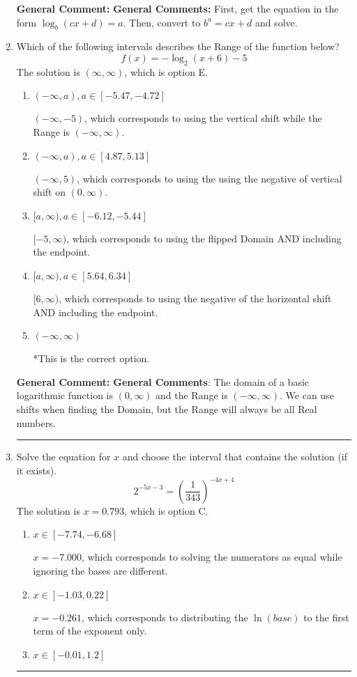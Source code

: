 \documentclass{extbook}[14pt]
\newcommand{\litem}[1]{\item #1

\rule{\textwidth}{0.4pt}}
\begin{document}
\begin{enumerate}
{\textbf{General Comment:} \textbf{General Comments:} First, get the equation in the form $\log_b{(cx+d)} = a$. Then, convert to $b^a = cx+d$ and solve.
}
\litem{
Which of the following intervals describes the Range of the function below?
\[ f(x) = -\log_2{(x+6)}-5 \]The solution is \( (\infty, \infty) \), which is option E.\begin{enumerate}[label=\Alph*.]
\item \( (-\infty, a), a \in [-5.47, -4.72] \)

$(-\infty, -5)$, which corresponds to using the vertical shift while the Range is $(-\infty, \infty)$.
\item \( (-\infty, a), a \in [4.87, 5.13] \)

$(-\infty, 5)$, which corresponds to using the using the negative of vertical shift on $(0, \infty)$.
\item \( [a, \infty), a \in [-6.12, -5.44] \)

$[-5, \infty)$, which corresponds to using the flipped Domain AND including the endpoint.
\item \( [a, \infty), a \in [5.64, 6.34] \)

$[6, \infty)$, which corresponds to using the negative of the horizontal shift AND including the endpoint.
\item \( (-\infty, \infty) \)

*This is the correct option.
\end{enumerate}

\textbf{General Comment:} \textbf{General Comments}: The domain of a basic logarithmic function is $(0, \infty)$ and the Range is $(-\infty, \infty)$. We can use shifts when finding the Domain, but the Range will always be all Real numbers.
}
\litem{
Solve the equation for $x$ and choose the interval that contains the solution (if it exists).
\[ 2^{-5x-3} = \left(\frac{1}{343}\right)^{-4x+4} \]The solution is \( x = 0.793 \), which is option C.\begin{enumerate}[label=\Alph*.]
\item \( x \in [-7.74, -6.68] \)

$x = -7.000$, which corresponds to solving the numerators as equal while ignoring the bases are different.
\item \( x \in [-1.03, 0.22] \)

$x = -0.261$, which corresponds to distributing the $\ln(base)$ to the first term of the exponent only.
\item \( x \in [-0.01, 1.2] \)


\end{enumerate}}
\end{enumerate}
\end{document}
